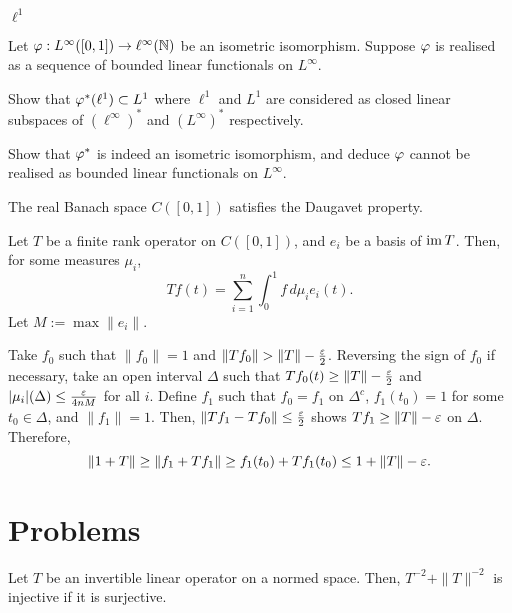 \documentclass{../note}
\begin{document}
\begin{prb}
$\ell^1$
\end{prb}

\begin{prb}
Let $\varphi:L^\infty([0,1])\to\ell^\infty(\mathbb{N})$ be an isometric isomorphism.
Suppose $\varphi$ is realised as a sequence of bounded linear functionals on $L^\infty$.
\begin{parts}
\item
Show that $\varphi^*(\ell^1)\subset L^1$ where $\ell^1$ and $L^1$ are considered as closed linear subspaces of $(\ell^\infty)^*$ and $(L^\infty)^*$ respectively.
\item Show that $\varphi^*$ is indeed an isometric isomorphism, and deduce $\varphi$ cannot be realised as bounded linear functionals on $L^\infty$.
\end{parts}
\end{prb}


\begin{prb}
\begin{parts}
\item The real Banach space $C([0,1])$ satisfies the Daugavet property.
\end{parts}
\end{prb}
\begin{pf}
Let $T$ be a finite rank operator on $C([0,1])$, and $e_i$ be a basis of $\operatorname{im} T$.
Then, for some measures $\mu_i$,
\[Tf(t)=\sum_{i=1}^n\int_0^1f\,d\mu_ie_i(t).\]
Let $M:=\max\|e_i\|$.

Take $f_0$ such that $\|f_0\|=1$ and $\|Tf_0\|>\|T\|-\frac\e2$.
Reversing the sign of $f_0$ if necessary, take an open interval $\Delta$ such that $Tf_0(t)\ge\|T\|-\frac{\varepsilon}2$ and $|\mu_i|(\Delta)\le\frac{\varepsilon}{4nM}$ for all $i$.
Define $f_1$ such that $f_0=f_1$ on $\Delta^c$, $f_1(t_0)=1$ for some $t_0\in\Delta$, and $\|f_1\|=1$.
Then, $\|Tf_1-Tf_0\|\le\frac{\varepsilon}2$ shows $Tf_1\ge\|T\|-\varepsilon$ on $\Delta$.
Therefore,
\[\|1+T\|\ge\|f_1+Tf_1\|\ge f_1(t_0)+Tf_1(t_0)\le1+\|T\|-\varepsilon.\]
\end{pf}


\section*{Problems}
\begin{prb}
Let $T$ be an invertible linear operator on a normed space.
Then, $T^{-2}+\|T\|^{-2}$ is injective if it is surjective.
\end{prb}
\end{document}
